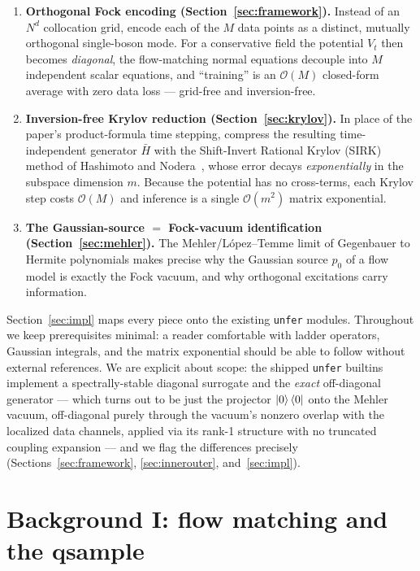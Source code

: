 \documentclass[11pt, a4paper]{article}
\begin{document}
\begin{enumerate}
\item \textbf{Orthogonal Fock encoding (Section~\ref{sec:framework}).} Instead
of an $N^d$ collocation grid, encode each of the $M$ data points as a distinct,
mutually orthogonal single-boson mode. For a conservative field the potential
$V_t$ then becomes \emph{diagonal}, the flow-matching normal equations decouple
into $M$ independent scalar equations, and ``training'' is an $\mathcal{O}(M)$
closed-form average with zero data loss --- grid-free and inversion-free.

\item \textbf{Inversion-free Krylov reduction (Section~\ref{sec:krylov}).} In
place of the paper's product-formula time stepping, compress the resulting
time-independent generator $\bar H$ with the Shift-Invert Rational Krylov
(SIRK) method of Hashimoto and Nodera~\cite{Hashimoto2019}, whose error decays
\emph{exponentially} in the subspace dimension $m$. Because the potential has
no cross-terms, each Krylov step costs $\mathcal{O}(M)$ and inference is a
single $\mathcal{O}(m^2)$ matrix exponential.

\item \textbf{The Gaussian-source $=$ Fock-vacuum identification
(Section~\ref{sec:mehler}).} The Mehler/L\'opez--Temme limit of Gegenbauer to
Hermite polynomials makes precise why the Gaussian source $p_0$ of a flow model
is exactly the Fock vacuum, and why orthogonal excitations carry information.
\end{enumerate}

Section~\ref{sec:impl} maps every piece onto the existing \texttt{unfer}
modules. Throughout we keep prerequisites minimal: a reader comfortable with
ladder operators, Gaussian integrals, and the matrix exponential should be able
to follow without external references. We are explicit about scope: the
shipped \texttt{unfer} builtins implement a spectrally-stable diagonal
surrogate and the \emph{exact} off-diagonal generator --- which turns out
to be just the projector $\ket{0}\bra{0}$ onto the Mehler vacuum,
off-diagonal purely through the vacuum's nonzero overlap with the
localized data channels, applied via its rank-1 structure with no
truncated coupling expansion --- and we flag the differences precisely
(Sections~\ref{sec:framework}, \ref{sec:innerouter}, and~\ref{sec:impl}).

\section{Background I: flow matching and the qsample}
\label{sec:flowprimer}
\end{document}

